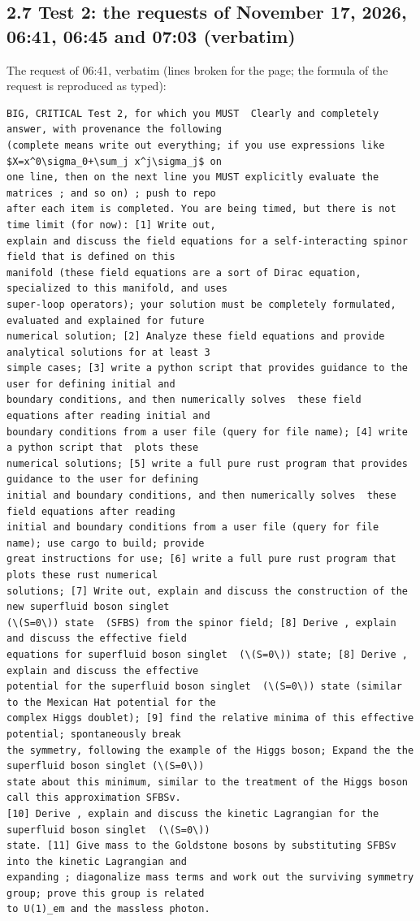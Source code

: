 \documentclass[
  10pt,
]{article}
\begin{document}
\hypertarget{test-2-the-requests-of-november-17-2026-0641-0645-and-0703-verbatim}{%
\subsection{2.7 Test 2: the requests of November 17, 2026, 06:41, 06:45
and 07:03
(verbatim)}\label{test-2-the-requests-of-november-17-2026-0641-0645-and-0703-verbatim}}

The request of 06:41, verbatim (lines broken for the page; the formula
of the request is reproduced as typed):

\begin{verbatim}
BIG, CRITICAL Test 2, for which you MUST  Clearly and completely answer, with provenance the following
(complete means write out everything; if you use expressions like $X=x^0\sigma_0+\sum_j x^j\sigma_j$ on
one line, then on the next line you MUST explicitly evaluate the matrices ; and so on) ; push to repo
after each item is completed. You are being timed, but there is not time limit (for now): [1] Write out,
explain and discuss the field equations for a self-interacting spinor field that is defined on this
manifold (these field equations are a sort of Dirac equation, specialized to this manifold, and uses
super-loop operators); your solution must be completely formulated, evaluated and explained for future
numerical solution; [2] Analyze these field equations and provide analytical solutions for at least 3
simple cases; [3] write a python script that provides guidance to the user for defining initial and
boundary conditions, and then numerically solves  these field equations after reading initial and
boundary conditions from a user file (query for file name); [4] write a python script that  plots these
numerical solutions; [5] write a full pure rust program that provides guidance to the user for defining
initial and boundary conditions, and then numerically solves  these field equations after reading
initial and boundary conditions from a user file (query for file name); use cargo to build; provide
great instructions for use; [6] write a full pure rust program that plots these rust numerical
solutions; [7] Write out, explain and discuss the construction of the new superfluid boson singlet
(\(S=0\)) state  (SFBS) from the spinor field; [8] Derive , explain and discuss the effective field
equations for superfluid boson singlet  (\(S=0\)) state; [8] Derive , explain and discuss the effective
potential for the superfluid boson singlet  (\(S=0\)) state (similar to the Mexican Hat potential for the
complex Higgs doublet); [9] find the relative minima of this effective potential; spontaneously break
the symmetry, following the example of the Higgs boson; Expand the the superfluid boson singlet (\(S=0\))
state about this minimum, similar to the treatment of the Higgs boson call this approximation SFBSv.
[10] Derive , explain and discuss the kinetic Lagrangian for the superfluid boson singlet  (\(S=0\))
state. [11] Give mass to the Goldstone bosons by substituting SFBSv into the kinetic Lagrangian and
expanding ; diagonalize mass terms and work out the surviving symmetry group; prove this group is related
to U(1)_em and the massless photon.
\end{verbatim}
\end{document}
